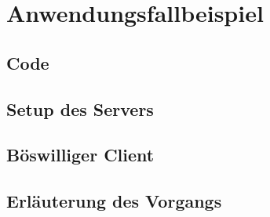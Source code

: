 \section{Anwendungsfallbeispiel}
\subsection{Code}
\subsection{Setup des Servers}
\subsection{Böswilliger Client}
\subsection{Erläuterung des Vorgangs}